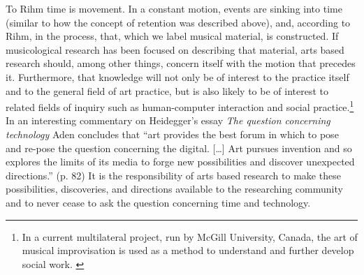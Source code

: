 To Rihm time is movement. In a constant motion, events are sinking into time (similar to how the concept of retention was described above), and, according to Rihm, in the process, that, which we label musical material, is constructed. If musicological research has been focused on describing that material, arts based research should, among other things, concern itself with the motion that precedes it. Furthermore, that knowledge will not only be of interest to the practice itself and to the general field of art practice, but is also likely to be of interest to related fields of inquiry such as human-computer interaction and social practice.\footnote{In a current multilateral project, run by McGill University, Canada, the art of musical improvisation is used as a method to understand and further develop social work. \cite{lewis09}} In an interesting commentary on Heidegger's essay \emph{The question concerning technology} Aden \citet{evens05} concludes that ``art provides the best forum in which to pose and re-pose the question concerning the digital. [\ldots] Art pursues invention and so explores the limits of its media to forge new possibilities and discover unexpected directions.'' (p. 82) It is the responsibility of arts based research to make these possibilities, discoveries, and directions available to the researching community and to never cease to ask the question concerning time and technology.














